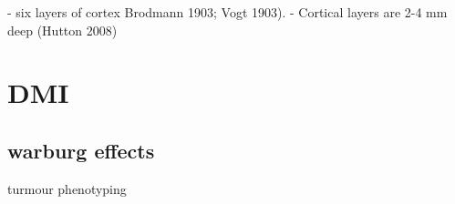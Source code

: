 - six layers of cortex Brodmann 1903; Vogt 1903).
- Cortical layers are 2-4 mm deep (Hutton 2008)


\section{\gls{DMI}}
\subsection{warburg effects}
turmour phenotyping
